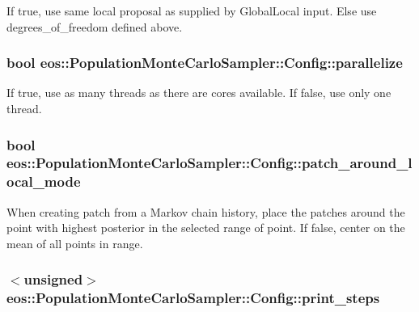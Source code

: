 \label{structeos_1_1PopulationMonteCarloSampler_1_1Config_aee29a36e8e23c971ba1e36616e9affb4}
If true, use same local proposal as supplied by GlobalLocal input. Else use degrees\_\-of\_\-freedom defined above. \hypertarget{structeos_1_1PopulationMonteCarloSampler_1_1Config_abe02d7abd41f52ae2eaf3eba25522f50}{
\subsubsection[{parallelize}]{\setlength{\rightskip}{0pt plus 5cm}bool {\bf eos::PopulationMonteCarloSampler::Config::parallelize}}}
\label{structeos_1_1PopulationMonteCarloSampler_1_1Config_abe02d7abd41f52ae2eaf3eba25522f50}
If true, use as many threads as there are cores available. If false, use only one thread. \hypertarget{structeos_1_1PopulationMonteCarloSampler_1_1Config_a0bffb06da5f9f3ef917eec1ce2139ce1}{
\subsubsection[{patch\_\-around\_\-local\_\-mode}]{\setlength{\rightskip}{0pt plus 5cm}bool {\bf eos::PopulationMonteCarloSampler::Config::patch\_\-around\_\-local\_\-mode}}}
\label{structeos_1_1PopulationMonteCarloSampler_1_1Config_a0bffb06da5f9f3ef917eec1ce2139ce1}
When creating patch from a Markov chain history, place the patches around the point with highest posterior in the selected range of point. If false, center on the mean of all points in range. \hypertarget{structeos_1_1PopulationMonteCarloSampler_1_1Config_a55d2a98f36625d31eb9117c76212771f}{
\subsubsection[{print\_\-steps}]{$<$unsigned$>$ {\bf eos::PopulationMonteCarloSampler::Config::print\_\-steps}}}
